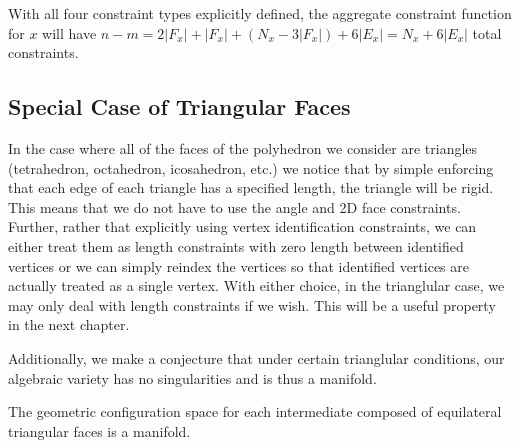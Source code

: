 With all four constraint types explicitly defined, the aggregate constraint function for $x$ will have $n-m = 2|F_x|+ |F_x| + (N_x - 3|F_x|) + 6|E_x| = N_x + 6|E_x|$ total constraints. 



\subsection{Special Case of Triangular Faces}

In the case where all of the faces of the polyhedron we consider are triangles (tetrahedron, octahedron, icosahedron, etc.) we notice that by simple enforcing that each edge of each triangle has a specified length, the triangle will be rigid. This means that we do not have to use the angle and 2D face constraints. Further, rather that explicitly using vertex identification constraints, we can either treat them as length constraints with zero length between identified vertices or we can simply reindex the vertices so that identified vertices are actually treated as a single vertex. With either choice, in the trianglular case, we may only deal with length constraints if we wish. This will be a useful property in the next chapter. 

Additionally, we make a conjecture that under certain trianglular conditions, our algebraic variety has no singularities and is thus a manifold.
\begin{mycon}
\label{con:TriMan}
The geometric configuration space for each intermediate composed of equilateral triangular faces is a manifold.
\end{mycon}

